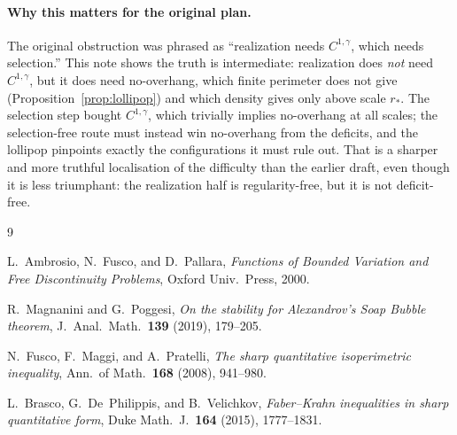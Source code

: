 \documentclass[11pt]{article}
\theoremstyle{definition}
\begin{document}
\paragraph{Why this matters for the original plan.} The original
obstruction was phrased as ``realization needs $C^{1,\gamma}$, which needs
selection.'' This note shows the truth is intermediate: realization does
\emph{not} need $C^{1,\gamma}$, but it does need no-overhang, which finite
perimeter does not give (Proposition~\ref{prop:lollipop}) and which density
gives only above scale $r_*$. The selection step bought $C^{1,\gamma}$,
which trivially implies no-overhang at all scales; the selection-free route
must instead win no-overhang from the deficits, and the lollipop pinpoints
exactly the configurations it must rule out. That is a sharper and more
truthful localisation of the difficulty than the earlier draft, even though
it is less triumphant: the realization half is regularity-free, but it is
not deficit-free.

\begin{thebibliography}{9}

 L.~Ambrosio, N.~Fusco, and D.~Pallara, \emph{Functions of
Bounded Variation and Free Discontinuity Problems}, Oxford Univ.\ Press,
2000.

 R.~Magnanini and G.~Poggesi, \emph{On the stability for
Alexandrov's Soap Bubble theorem}, J.~Anal.\ Math.\ \textbf{139} (2019),
179--205.

 N.~Fusco, F.~Maggi, and A.~Pratelli, \emph{The sharp
quantitative isoperimetric inequality}, Ann.\ of Math.\ \textbf{168}
(2008), 941--980.

 L.~Brasco, G.~De~Philippis, and B.~Velichkov,
\emph{Faber--Krahn inequalities in sharp quantitative form}, Duke
Math.~J.\ \textbf{164} (2015), 1777--1831.

\end{thebibliography}
\end{document}
